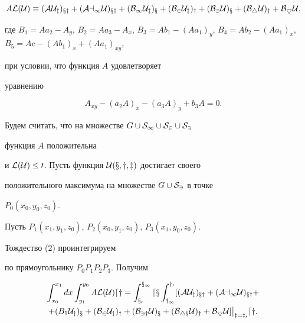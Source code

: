 \begin{equation} 


A\cal L(\cal U)\equiv(A\cal U_z)_{xy}+(A a_1\cal U)_{xy}+ 


(B_1\cal U_z)_x+(B_2\cal U_z)_y+ 


(B_3\cal U)_x+(B_4\cal U)_y+B_5\cal U, 


\end{equation} 


где $B_1=A a_2-A_y$, $B_2=A a_3-A_x$, $B_3=A b_1-(A a_1)_y$, $B_4=A 


b_2-(A a_1)_x$, $B_5=A c-(A b_1)_x+(A a_1)_{xy}$,


при условии, что функция $A$ удовлетворяет 


уравнению 


\begin{equation} 


A_{xy}-(a_2A)_x-(a_3A)_y+b_3A=0. 


\end{equation} 


 


Будем считать, что на множестве $G\cup\cal S_1\cup\cal S_2\cup\cal S_3$ 


функция $A$ положительна 


и $\cal L(\cal U)\le0$. Пусть функция $\cal U(x,y,z)$ достигает своего 


положительного максимума на множестве $G\cup\cal S_3$ в точке 


$P_0(x_0,y_0,z_0)$. 


Пусть $P_1(x_1,y_1,z_0)$, $P_2(x_0,y_1,z_0)$, $P_3(x_1,y_0,z_0)$. 


Тождество (2) проинтегрируем 


по прямоугольнику $P_0P_1P_2P_3$. Получим 


\begin{multline} 


\int^{x_1}_{x_0}dx\int^{y_0}_{y_1}A\cal L(\cal U)dy= 


\int^{x_1}_{x_0}dx\int^{y_0}_{y_1}[(A\cal U_z)_{xy}+ 


(A a_1\cal U)_{xy}+ \\ 


% 


+(B_1\cal U_z)_x+(B_2\cal U_z)_y+(B_{3y}\cal U)_x+ 


(B_{4x}\cal U)_y+B_5\cal U]\big|_{z=z_0}dy. 


\end{multline} 


